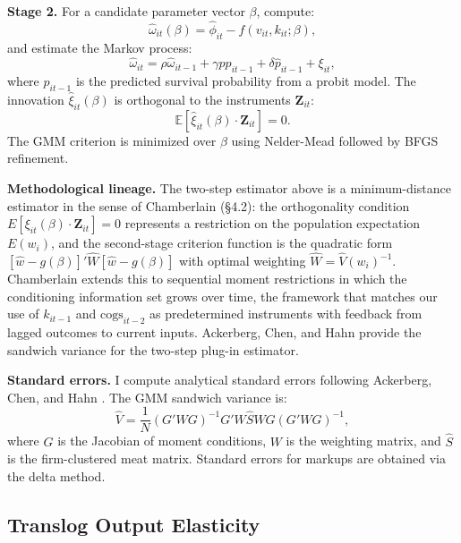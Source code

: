 \documentclass[11pt]{article}
\newcommand{\E}{\mathbb{E}}
\begin{document}
\textbf{Stage 2.} For a candidate parameter vector $\beta$, compute:
\begin{equation}
    \hat{\omega}_{it}(\beta) = \hat{\phi}_{it} - f(v_{it}, k_{it}; \beta),
\end{equation}
and estimate the Markov process:
\begin{equation}
    \hat{\omega}_{it} = \rho \hat{\omega}_{it-1} + \gamma pp_{it-1} + \delta \hat{p}_{it-1} + \xi_{it},
\end{equation}
where $\hat{p}_{it-1}$ is the predicted survival probability from a probit model. The innovation $\hat{\xi}_{it}(\beta)$ is orthogonal to the instruments $\mathbf{Z}_{it}$:
\begin{equation}
    \E[\hat{\xi}_{it}(\beta) \cdot \mathbf{Z}_{it}] = 0.
\end{equation}
The GMM criterion is minimized over $\beta$ using Nelder-Mead followed by BFGS refinement.

\textbf{Methodological lineage.} The two-step estimator above is a minimum-distance estimator in the sense of Chamberlain \cite{Chamberlain1984} (\S4.2): the orthogonality condition $E[\xi_{it}(\beta) \cdot \mathbf{Z}_{it}] = 0$ represents a restriction on the population expectation $E(w_i)$, and the second-stage criterion function is the quadratic form $[\hat w - g(\beta)]' \hat W [\hat w - g(\beta)]$ with optimal weighting $\hat W = \hat V(w_i)^{-1}$. Chamberlain \cite{Chamberlain2022} extends this to sequential moment restrictions in which the conditioning information set grows over time, the framework that matches our use of $k_{it-1}$ and $\text{cogs}_{it-2}$ as predetermined instruments with feedback from lagged outcomes to current inputs. Ackerberg, Chen, and Hahn \cite{ACH2012} provide the sandwich variance for the two-step plug-in estimator.

\textbf{Standard errors.} I compute analytical standard errors following Ackerberg, Chen, and Hahn \cite{ACH2012}. The GMM sandwich variance is:
\begin{equation}
    \hat{V} = \frac{1}{N} (G'WG)^{-1} G'W \hat{S} W G (G'WG)^{-1},
\end{equation}
where $G$ is the Jacobian of moment conditions, $W$ is the weighting matrix, and $\hat{S}$ is the firm-clustered meat matrix. Standard errors for markups are obtained via the delta method.

\subsection{Translog Output Elasticity}\label{app:translog}
\end{document}
